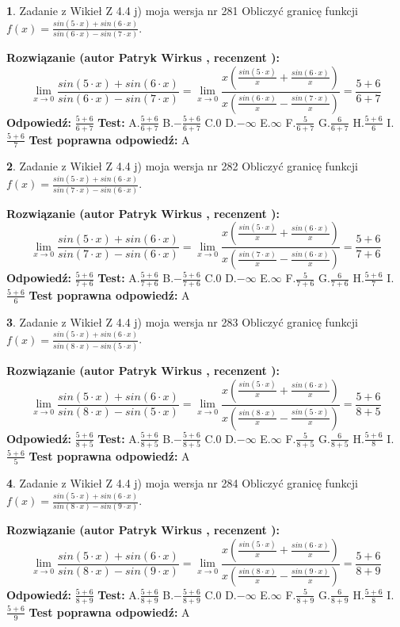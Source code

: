 \documentclass[12pt, a4paper]{article}
\theoremstyle{definition} %
\newtheorem{zad}{}
\newcommand{\zadStart}[1]{\begin{zad}#1\newline}
\newcommand{\zadStop}{\end{zad}}
\newcommand{\rozwStart}[2]{\noindent \textbf{Rozwiązanie (autor #1 , recenzent #2): }\newline}
\newcommand{\rozwStop}{\newline}
\newcommand{\odpStart}{\noindent \textbf{Odpowiedź:}\newline}
\newcommand{\odpStop}{\newline}
\newcommand{\testStart}{\noindent \textbf{Test:}\newline}
\newcommand{\testStop}{\newline}
\newcommand{\kluczStart}{\noindent \textbf{Test poprawna odpowiedź:}\newline}
\newcommand{\kluczStop}{\newline}
\begin{document}
\zadStart{Zadanie z Wikieł Z 4.4 j) moja wersja nr 281}
Obliczyć granicę funkcji $f(x)=\frac{sin(5\cdot x) +sin(6\cdot x)}{sin(6\cdot x) -sin(7\cdot x)}$.
\zadStop
\rozwStart{Patryk Wirkus}{}
$$\lim\limits_{x\to 0}\frac{sin(5\cdot x) +sin(6\cdot x)}{sin(6\cdot x) -sin(7\cdot x)}=\lim\limits_{x\to 0}\frac{x(\frac{sin(5\cdot x)}{x}+\frac{sin(6\cdot x)}{x})}{x(\frac{sin(6\cdot x)}{x}-\frac{sin(7\cdot x)}{x})}=\frac{5+6}{6+7}$$
\rozwStop
\odpStart
$\frac{5+6}{6+7}$
\odpStop
\testStart
A.$\frac{5+6}{6+7}$
B.$-\frac{5+6}{6+7}$
C.$0$
D.$-\infty$
E.$\infty$
F.$\frac{5}{6+7}$
G.$\frac{6}{6+7}$
H.$\frac{5+6}{6}$
I.$\frac{5+6}{7}$
\testStop
\kluczStart
A
\kluczStop



\zadStart{Zadanie z Wikieł Z 4.4 j) moja wersja nr 282}
Obliczyć granicę funkcji $f(x)=\frac{sin(5\cdot x) +sin(6\cdot x)}{sin(7\cdot x) -sin(6\cdot x)}$.
\zadStop
\rozwStart{Patryk Wirkus}{}
$$\lim\limits_{x\to 0}\frac{sin(5\cdot x) +sin(6\cdot x)}{sin(7\cdot x) -sin(6\cdot x)}=\lim\limits_{x\to 0}\frac{x(\frac{sin(5\cdot x)}{x}+\frac{sin(6\cdot x)}{x})}{x(\frac{sin(7\cdot x)}{x}-\frac{sin(6\cdot x)}{x})}=\frac{5+6}{7+6}$$
\rozwStop
\odpStart
$\frac{5+6}{7+6}$
\odpStop
\testStart
A.$\frac{5+6}{7+6}$
B.$-\frac{5+6}{7+6}$
C.$0$
D.$-\infty$
E.$\infty$
F.$\frac{5}{7+6}$
G.$\frac{6}{7+6}$
H.$\frac{5+6}{7}$
I.$\frac{5+6}{6}$
\testStop
\kluczStart
A
\kluczStop



\zadStart{Zadanie z Wikieł Z 4.4 j) moja wersja nr 283}
Obliczyć granicę funkcji $f(x)=\frac{sin(5\cdot x) +sin(6\cdot x)}{sin(8\cdot x) -sin(5\cdot x)}$.
\zadStop
\rozwStart{Patryk Wirkus}{}
$$\lim\limits_{x\to 0}\frac{sin(5\cdot x) +sin(6\cdot x)}{sin(8\cdot x) -sin(5\cdot x)}=\lim\limits_{x\to 0}\frac{x(\frac{sin(5\cdot x)}{x}+\frac{sin(6\cdot x)}{x})}{x(\frac{sin(8\cdot x)}{x}-\frac{sin(5\cdot x)}{x})}=\frac{5+6}{8+5}$$
\rozwStop
\odpStart
$\frac{5+6}{8+5}$
\odpStop
\testStart
A.$\frac{5+6}{8+5}$
B.$-\frac{5+6}{8+5}$
C.$0$
D.$-\infty$
E.$\infty$
F.$\frac{5}{8+5}$
G.$\frac{6}{8+5}$
H.$\frac{5+6}{8}$
I.$\frac{5+6}{5}$
\testStop
\kluczStart
A
\kluczStop



\zadStart{Zadanie z Wikieł Z 4.4 j) moja wersja nr 284}
Obliczyć granicę funkcji $f(x)=\frac{sin(5\cdot x) +sin(6\cdot x)}{sin(8\cdot x) -sin(9\cdot x)}$.
\zadStop
\rozwStart{Patryk Wirkus}{}
$$\lim\limits_{x\to 0}\frac{sin(5\cdot x) +sin(6\cdot x)}{sin(8\cdot x) -sin(9\cdot x)}=\lim\limits_{x\to 0}\frac{x(\frac{sin(5\cdot x)}{x}+\frac{sin(6\cdot x)}{x})}{x(\frac{sin(8\cdot x)}{x}-\frac{sin(9\cdot x)}{x})}=\frac{5+6}{8+9}$$
\rozwStop
\odpStart
$\frac{5+6}{8+9}$
\odpStop
\testStart
A.$\frac{5+6}{8+9}$
B.$-\frac{5+6}{8+9}$
C.$0$
D.$-\infty$
E.$\infty$
F.$\frac{5}{8+9}$
G.$\frac{6}{8+9}$
H.$\frac{5+6}{8}$
I.$\frac{5+6}{9}$
\testStop
\kluczStart
A
\kluczStop
\end{document}
